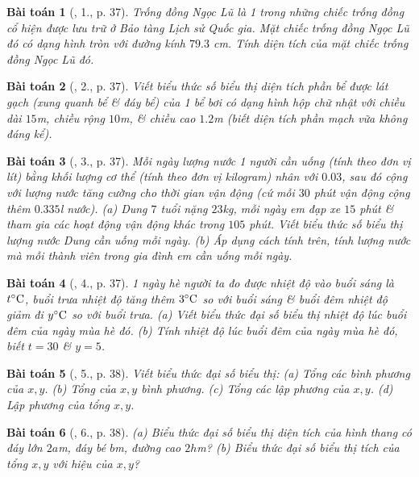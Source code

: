 \documentclass{article}
\newtheorem{baitoan}{Bài toán}
\begin{document}
\begin{baitoan}[\cite{SBT_Toan_7_Canh_Dieu_tap_2}, 1., p. 37]
	Trống đồng Ngọc Lũ là 1 trong những chiếc trống đồng cổ hiện được lưu trữ ở Bảo tàng Lịch sử Quốc gia. Mặt chiếc trống đồng Ngọc Lũ đó có dạng hình tròn với đường kính $79.3$ \emph{cm}. Tính diện tích của mặt chiếc trống đồng Ngọc Lũ đó.
\end{baitoan}

\begin{baitoan}[\cite{SBT_Toan_7_Canh_Dieu_tap_2}, 2., p. 37]
	Viết biểu thức số biểu thị diện tích phần bể được lát gạch (xung quanh bể \& đáy bể) của 1 bể bơi có dạng hình hộp chữ nhật với chiều dài $15$\emph{m}, chiều rộng $10$\emph{m}, \& chiều cao $1.2$\emph{m} (biết diện tích phần mạch vữa không đáng kể).
\end{baitoan}

\begin{baitoan}[\cite{SBT_Toan_7_Canh_Dieu_tap_2}, 3., p. 37]
	Mỗi ngày lượng nước 1 người cần uống (tính theo đơn vị lít) bằng khối lượng cơ thể (tính theo đơn vị kilogram) nhân với $0.03$, sau đó cộng với lượng nước tăng cường cho thời gian vận động (cứ mỗi $30$ phút vận động cộng thêm $0.335$\emph{l} nước). (a) Dung $7$ tuổi nặng $23$\emph{kg}, mỗi ngày em đạp xe $15$ phút \& tham gia các hoạt động vận động khác trong $105$ phút. Viết biểu thức số biểu thị lượng nước Dung cần uống mỗi ngày. (b) Áp dụng cách tính trên, tính lượng nước mà mỗi thành viên trong gia đình em cần uống mỗi ngày.
\end{baitoan}

\begin{baitoan}[\cite{SBT_Toan_7_Canh_Dieu_tap_2}, 4., p. 37]
	1 ngày hè người ta đo được nhiệt độ vào buổi sáng là $t^\circ{\rm C}$, buổi trưa nhiệt độ tăng thêm $3^\circ{\rm C}$ so với buổi sáng \& buổi đêm nhiệt độ giảm đi $y^\circ{\rm C}$ so với buổi trưa. (a) Viết biểu thức đại số biểu thị nhiệt độ lúc buổi đêm của ngày mùa hè đó. (b) Tính nhiệt độ lúc buổi đêm của ngày mùa hè đó, biết $t = 30$ \& $y = 5$.
\end{baitoan}

\begin{baitoan}[\cite{SBT_Toan_7_Canh_Dieu_tap_2}, 5., p. 38]
	Viết biểu thức đại số biểu thị: (a) Tổng các bình phương của $x,y$. (b) Tổng của $x,y$ bình phương. (c) Tổng các lập phương của $x,y$. (d) Lập phương của tổng $x,y$.
\end{baitoan}

\begin{baitoan}[\cite{SBT_Toan_7_Canh_Dieu_tap_2}, 6., p. 38]
	(a) Biểu thức đại số biểu thị diện tích của hình thang có đáy lớn $2a$\emph{m}, đáy bé $b$\emph{m}, đường cao $2h$\emph{m}? (b) Biểu thức đại số biểu thị tích của tổng $x,y$ với hiệu của $x,y$?
\end{baitoan}
\end{document}
